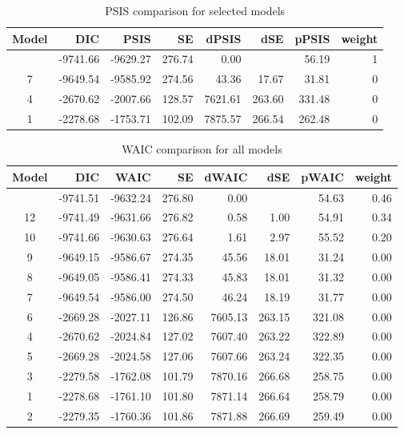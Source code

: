 \documentclass[
]{agujournal2019}
\begin{document}
\begin{longtable}[]{@{}crrrrrrr@{}}

\caption{\label{tbl-rq1-psis}PSIS comparison for selected models}

\tabularnewline

\toprule\noalign{}
Model & DIC & PSIS & SE & dPSIS & dSE & pPSIS & weight \\
\midrule\noalign{}
\endhead
\bottomrule\noalign{}
\endlastfoot
10 & -9741.66 & -9629.27 & 276.74 & 0.00 & & 56.19 & 1 \\
7 & -9649.54 & -9585.92 & 274.56 & 43.36 & 17.67 & 31.81 & 0 \\
4 & -2670.62 & -2007.66 & 128.57 & 7621.61 & 263.60 & 331.48 & 0 \\
1 & -2278.68 & -1753.71 & 102.09 & 7875.57 & 266.54 & 262.48 & 0 \\

\end{longtable}

\begin{longtable}[]{@{}crrrrrrr@{}}

\caption{\label{tbl-rq3-waic}WAIC comparison for all models}

\tabularnewline

\toprule\noalign{}
Model & DIC & WAIC & SE & dWAIC & dSE & pWAIC & weight \\
\midrule\noalign{}
\endhead
\bottomrule\noalign{}
\endlastfoot
11 & -9741.51 & -9632.24 & 276.80 & 0.00 & & 54.63 & 0.46 \\
12 & -9741.49 & -9631.66 & 276.82 & 0.58 & 1.00 & 54.91 & 0.34 \\
10 & -9741.66 & -9630.63 & 276.64 & 1.61 & 2.97 & 55.52 & 0.20 \\
9 & -9649.15 & -9586.67 & 274.35 & 45.56 & 18.01 & 31.24 & 0.00 \\
8 & -9649.05 & -9586.41 & 274.33 & 45.83 & 18.01 & 31.32 & 0.00 \\
7 & -9649.54 & -9586.00 & 274.50 & 46.24 & 18.19 & 31.77 & 0.00 \\
6 & -2669.28 & -2027.11 & 126.86 & 7605.13 & 263.15 & 321.08 & 0.00 \\
4 & -2670.62 & -2024.84 & 127.02 & 7607.40 & 263.22 & 322.89 & 0.00 \\
5 & -2669.28 & -2024.58 & 127.06 & 7607.66 & 263.24 & 322.35 & 0.00 \\
3 & -2279.58 & -1762.08 & 101.79 & 7870.16 & 266.68 & 258.75 & 0.00 \\
1 & -2278.68 & -1761.10 & 101.80 & 7871.14 & 266.64 & 258.79 & 0.00 \\
2 & -2279.35 & -1760.36 & 101.86 & 7871.88 & 266.69 & 259.49 & 0.00 \\

\end{longtable}
\end{document}

